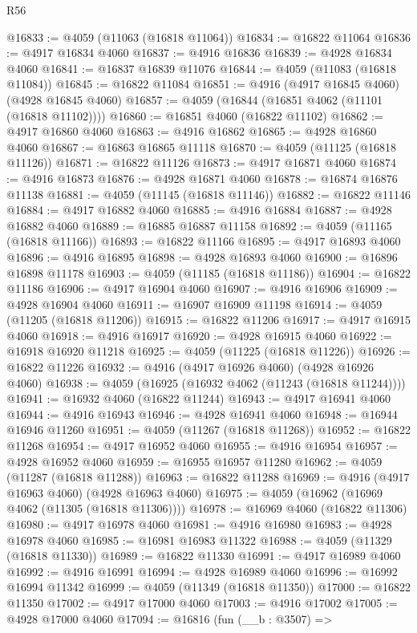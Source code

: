 \begin{lexlean}{R56}
\begin{coremodule}
@16833 := @4059 (@11063 (@16818 @11064))
@16834 := @16822 @11064
@16836 := @4917 @16834 @4060
@16837 := @4916 @16836
@16839 := @4928 @16834 @4060
@16841 := @16837 @16839 @11076
@16844 := @4059 (@11083 (@16818 @11084))
@16845 := @16822 @11084
@16851 := @4916 (@4917 @16845 @4060) (@4928 @16845 @4060)
@16857 := @4059 (@16844 (@16851 @4062 (@11101 (@16818 @11102))))
@16860 := @16851 @4060 (@16822 @11102)
@16862 := @4917 @16860 @4060
@16863 := @4916 @16862
@16865 := @4928 @16860 @4060
@16867 := @16863 @16865 @11118
@16870 := @4059 (@11125 (@16818 @11126))
@16871 := @16822 @11126
@16873 := @4917 @16871 @4060
@16874 := @4916 @16873
@16876 := @4928 @16871 @4060
@16878 := @16874 @16876 @11138
@16881 := @4059 (@11145 (@16818 @11146))
@16882 := @16822 @11146
@16884 := @4917 @16882 @4060
@16885 := @4916 @16884
@16887 := @4928 @16882 @4060
@16889 := @16885 @16887 @11158
@16892 := @4059 (@11165 (@16818 @11166))
@16893 := @16822 @11166
@16895 := @4917 @16893 @4060
@16896 := @4916 @16895
@16898 := @4928 @16893 @4060
@16900 := @16896 @16898 @11178
@16903 := @4059 (@11185 (@16818 @11186))
@16904 := @16822 @11186
@16906 := @4917 @16904 @4060
@16907 := @4916 @16906
@16909 := @4928 @16904 @4060
@16911 := @16907 @16909 @11198
@16914 := @4059 (@11205 (@16818 @11206))
@16915 := @16822 @11206
@16917 := @4917 @16915 @4060
@16918 := @4916 @16917
@16920 := @4928 @16915 @4060
@16922 := @16918 @16920 @11218
@16925 := @4059 (@11225 (@16818 @11226))
@16926 := @16822 @11226
@16932 := @4916 (@4917 @16926 @4060) (@4928 @16926 @4060)
@16938 := @4059 (@16925 (@16932 @4062 (@11243 (@16818 @11244))))
@16941 := @16932 @4060 (@16822 @11244)
@16943 := @4917 @16941 @4060
@16944 := @4916 @16943
@16946 := @4928 @16941 @4060
@16948 := @16944 @16946 @11260
@16951 := @4059 (@11267 (@16818 @11268))
@16952 := @16822 @11268
@16954 := @4917 @16952 @4060
@16955 := @4916 @16954
@16957 := @4928 @16952 @4060
@16959 := @16955 @16957 @11280
@16962 := @4059 (@11287 (@16818 @11288))
@16963 := @16822 @11288
@16969 := @4916 (@4917 @16963 @4060) (@4928 @16963 @4060)
@16975 := @4059 (@16962 (@16969 @4062 (@11305 (@16818 @11306))))
@16978 := @16969 @4060 (@16822 @11306)
@16980 := @4917 @16978 @4060
@16981 := @4916 @16980
@16983 := @4928 @16978 @4060
@16985 := @16981 @16983 @11322
@16988 := @4059 (@11329 (@16818 @11330))
@16989 := @16822 @11330
@16991 := @4917 @16989 @4060
@16992 := @4916 @16991
@16994 := @4928 @16989 @4060
@16996 := @16992 @16994 @11342
@16999 := @4059 (@11349 (@16818 @11350))
@17000 := @16822 @11350
@17002 := @4917 @17000 @4060
@17003 := @4916 @17002
@17005 := @4928 @17000 @4060
@17094 := @16816
    (fun (__b : @3507) =>

\end{coremodule}
\end{lexlean}
